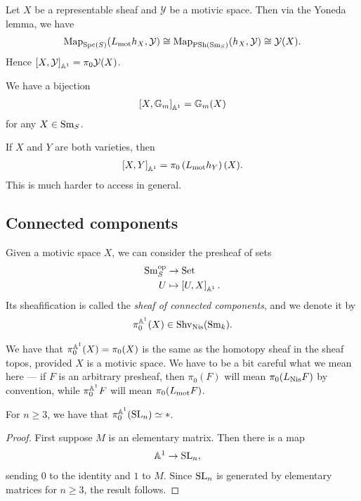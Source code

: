 \documentclass[11pt]{amsart}
\renewcommand{\Pre}{\mathrm{PSh}}
\begin{document}
\begin{example} Let $X$ be a representable sheaf and $\mathcal{Y}$ be a motivic space. Then via the Yoneda lemma, we have
\begin{align*}
    \Map_{\Spc(S)}(L_\mot h_X, \mathcal{Y}) \cong \Map_{\Pre(\Sm_S)} (h_X, \mathcal{Y}) \cong \mathcal{Y}(X).
\end{align*}
Hence $\left[ X,\mathcal{Y} \right]_{\mathbb{A}^1} = \pi_0 \mathcal{Y}(X)$.
\end{example}

\begin{example} We have a bijection
\begin{align*}
    \left[ X, \mathbb{G}_m \right]_{\mathbb{A}^1} = \mathbb{G}_m(X)
\end{align*}
for any $X\in \mathrm{Sm}_S$.
\end{example}

\begin{example} If $X$ and $Y$ are both varieties, then
\begin{align*}
    \left[ X,Y \right]_{\mathbb{A}^1} = \pi_0 \left( L_{\mathrm{mot}} h_Y \right)(X).
\end{align*}
This is much harder to access in general.
\end{example}

\subsection{Connected components}

Given a motivic space $X$, we can consider the presheaf of sets
\begin{align*}
    \mathrm{Sm}_S^{\mathrm{op}} &\to \mathrm{Set} \\
    U &\mapsto \left[ U,X \right]_{\mathbb{A}^1}.
\end{align*}
%
Its sheafification is called the \textit{sheaf of connected components}, and we denote it by
\begin{align*}
    \pi_0^{\mathbb{A}^1}(X) \in \mathrm{Shv}_{\mathrm{Nis}}(\mathrm{Sm}_k).
\end{align*}
%
\begin{note} We have that $\pi_0^{\mathbb{A}^1}(X) = \pi_0(X)$ is the same as the homotopy sheaf in the sheaf topos, provided $X$ is a motivic space. We have to be a bit careful what we mean here --- if $F$ is an arbitrary presheaf, then $\pi_0(F)$ will mean $\pi_0 (L_{\mathrm{Nis}} F)$ by convention, while $\pi_0^{\mathbb{A}^1}F$ will mean $\pi_0 (L_{\mathrm{mot}} F)$.
\end{note}

\begin{proposition} For $n\ge 3$, we have that $\pi_0^{\mathbb{A}^1}(\mathrm{SL}_n) \simeq \ast$.
\end{proposition}
\begin{proof} First suppose $M$ is an elementary matrix. Then there is a map
\begin{align*}
    \mathbb{A}^1 &\to \mathrm{SL}_n,
\end{align*}
sending $0$ to the identity and $1$ to $M$. Since $\mathrm{SL}_n$ is generated by elementary matrices for $n\ge 3$, the result follows.
\end{proof}
\end{document}
